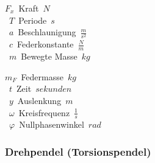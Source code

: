 
\begin{center}
	\begin{minipage}{0.3\textwidth}
		\unit{$F_x$}{Kraft}{$N$} \\
		\unit{$T$}{Periode}{$s$} \\
		\unit{$a$}{Beschlaunigung}{$\frac{m}{s^2}$} \\
		\unit{$c$}{Federkonstante}{$\frac{N}{m}$} \\
		\unit{$m$}{Bewegte Masse}{$kg$}
	\end{minipage}%
	\begin{minipage}{0.3\textwidth}
		\unit{$m_F$}{Federmasse}{$kg$} \\
		\unit{$t$}{Zeit}{$sekunden$} \\
		\unit{$y$}{Auslenkung}{$m$} \\
		\unit{$\omega$}{Kreisfrequenz}{$\frac{1}{s}$} \\
		\unit{$\varphi$}{Nullphasenwinkel}{$rad$}
	\end{minipage}
\end{center}





\subsubsection{Drehpendel (Torsionspendel)}

